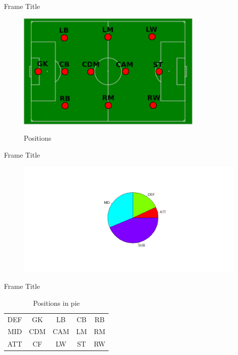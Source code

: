 \documentclass[aspectratio=169,xcolor=dvipsnames]{beamer}
\begin{document}
\begin{frame}{Frame Title}
\begin{figure}[H] 
\begin{center} 
  \includegraphics[width=9cm]{images.png}\\ 
  \caption{Positions} 
\end{center} 
\end{figure}
\end{frame}


\begin{frame}{Frame Title}
\begin{figure}[H] 
\begin{center} 
  \includegraphics[width=15cm]{Rplot6.png}\\
\end{center} 
\end{figure}
\end{frame}


\begin{frame}{Frame Title}
\begin{table}[ht]
\centering
\begin{tabular}{c|cccc}
    \hline
        DEF & GK & LB & CB & RB \\
        MID & CDM & CAM & LM & RM \\
        ATT & CF & LW & ST & RW  \\
    \hline
\end{tabular}
\caption{Positions in pie}
\end{table}
\end{frame}
\end{document}
